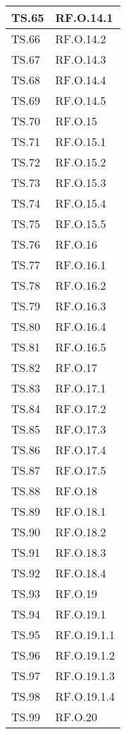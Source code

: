 {{{{{{{{{{\begin{tabularx}{\textwidth}{p{}|X}
    \hline
    TS.65 & RF.O.14.1 \\
    \hline
    TS.66 & RF.O.14.2 \\
    \hline
    TS.67 & RF.O.14.3 \\
    \hline
    TS.68 & RF.O.14.4 \\
    \hline
    TS.69 & RF.O.14.5 \\
    \hline
    TS.70 & RF.O.15 \\
    \hline
    TS.71 & RF.O.15.1 \\
    \hline
    TS.72 & RF.O.15.2 \\
    \hline
    TS.73 & RF.O.15.3 \\
    \hline
    TS.74 & RF.O.15.4 \\
    \hline
    TS.75 & RF.O.15.5 \\
    \hline
    TS.76 & RF.O.16 \\
    \hline
    TS.77 & RF.O.16.1 \\
    \hline
    TS.78 & RF.O.16.2 \\
    \hline
    TS.79 & RF.O.16.3 \\
    \hline
    TS.80 & RF.O.16.4 \\
    \hline
    TS.81 & RF.O.16.5 \\
    \hline
    TS.82 & RF.O.17 \\
    \hline
    TS.83 & RF.O.17.1 \\
    \hline
    TS.84 & RF.O.17.2 \\
    \hline
    TS.85 & RF.O.17.3 \\
    \hline
    TS.86 & RF.O.17.4 \\
    \hline
    TS.87 & RF.O.17.5 \\
    \hline
    TS.88 & RF.O.18 \\
    \hline
    TS.89 & RF.O.18.1 \\
    \hline
    TS.90 & RF.O.18.2 \\
    \hline
    TS.91 & RF.O.18.3 \\
    \hline
    TS.92 & RF.O.18.4 \\
    \hline
    TS.93 & RF.O.19 \\
    \hline
    TS.94 & RF.O.19.1 \\
    \hline
    TS.95 & RF.O.19.1.1 \\
    \hline
    TS.96 & RF.O.19.1.2 \\
    \hline
    TS.97 & RF.O.19.1.3 \\
    \hline
    TS.98 & RF.O.19.1.4 \\
    \hline
    TS.99 & RF.O.20 \\

\end{tabularx}}}}}}}}}}}
